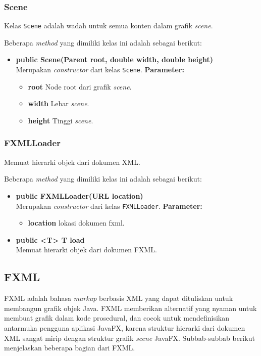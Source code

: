 \subsubsection{Scene}
Kelas \texttt{Scene} adalah wadah untuk semua konten dalam grafik \textit{scene}. 

Beberapa \textit{method} yang dimiliki kelas ini adalah sebagai berikut:
\begin{itemize}
	\item \textbf{public Scene(Parent root, double width, double height)}\\
    Merupakan \textit{constructor} dari kelas \texttt{Scene}.
    \textbf{Parameter:}
	\begin{itemize}
		\item \textbf{root} Node root dari grafik \textit{scene}.
		\item \textbf{width} Lebar \textit{scene}.
		\item \textbf{height} Tinggi \textit{scene}.
	\end{itemize}
\end{itemize}


\subsubsection{FXMLLoader}
Memuat hierarki objek dari dokumen XML.

Beberapa \textit{method} yang dimiliki kelas ini adalah sebagai berikut:
\begin{itemize}
	\item \textbf{public FXMLLoader(URL location)}\\
    Merupakan \textit{constructor} dari kelas \texttt{FXMLLoader}.
	\textbf{Parameter:}
	\begin{itemize}
		\item \textbf{location} lokasi dokumen fxml.
	\end{itemize}
	
	\item \textbf{public <T> T load}\\
	Memuat hierarki objek dari dokumen FXML.
\end{itemize}

\subsection{FXML}
FXML adalah bahasa \textit{markup} berbasis XML yang dapat dituliskan untuk membangun grafik objek Java. FXML memberikan alternatif yang nyaman untuk membuat grafik dalam kode prosedural, dan cocok untuk mendefinisikan antarmuka pengguna aplikasi JavaFX, karena struktur hierarki dari dokumen XML sangat mirip dengan struktur grafik \textit{scene} JavaFX. \cite{fxml} Subbab-subbab berikut menjelaskan beberapa bagian dari FXML.


